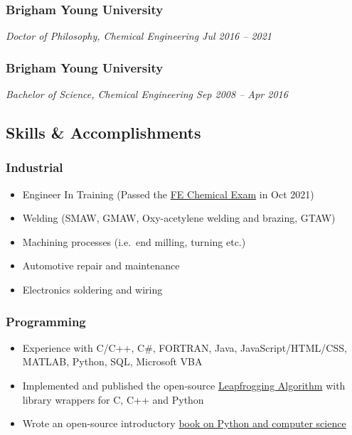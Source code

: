 \hypertarget{brigham-young-university}{%
\subsubsection{Brigham Young
University}\label{brigham-young-university}}

\emph{Doctor of Philosophy, Chemical Engineering \textbar{} Jul 2016 --
2021}

\hypertarget{brigham-young-university-1}{%
\subsubsection{Brigham Young
University}\label{brigham-young-university-1}}

\emph{Bachelor of Science, Chemical Engineering \textbar{} Sep 2008 --
Apr 2016}

\hypertarget{skills-accomplishments}{%
\subsection{Skills \& Accomplishments}\label{skills-accomplishments}}

\hypertarget{industrial}{%
\subsubsection{Industrial}\label{industrial}}

\begin{itemize}
\tightlist
\item
  Engineer In Training (Passed the
  \href{https://account.ncees.org/rn/2233456-1459800-66313c5}{FE
  Chemical Exam} in Oct 2021)
\item
  Welding (SMAW, GMAW, Oxy-acetylene welding and brazing, GTAW)
\item
  Machining processes (i.e.~end milling, turning etc.)
\item
  Automotive repair and maintenance
\item
  Electronics soldering and wiring
\end{itemize}

\hypertarget{programming}{%
\subsubsection{Programming}\label{programming}}

\begin{itemize}
\tightlist
\item
  Experience with C/C++, C\#, FORTRAN, Java, JavaScript/HTML/CSS,
  MATLAB, Python, SQL, Microsoft VBA
\item
  Implemented and published the open-source
  \href{https://github.com/flythereddflagg/lpfgopt}{Leapfrogging
  Algorithm} with library wrappers for C, C++ and Python
\item
  Wrote an open-source introductory
  \href{https://flythereddflagg.github.io/python_book/site/index.html}{book
  on Python and computer science}
\end{itemize}

